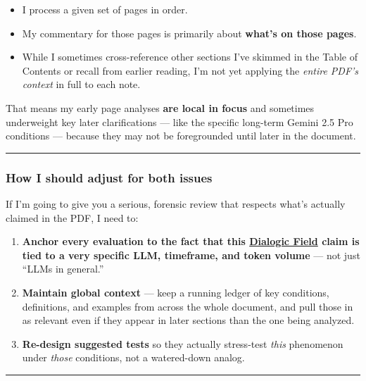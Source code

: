 \documentclass{article}
\begin{document}
\begin{itemize}
\item
  I process a given set of pages in order.
\item
  My commentary for those pages is primarily about \textbf{what's on those pages}.
\item
  While I sometimes cross-reference other sections I've skimmed in the Table of Contents or recall from earlier reading, I'm not yet applying the \emph{entire PDF's context} in full to each note.
\end{itemize}

That means my early page analyses \textbf{are local in focus} and sometimes underweight key later clarifications --- like the specific long-term Gemini 2.5 Pro conditions --- because they may not be foregrounded until later in the document.

\begin{center}\rule{0.5\linewidth}{0.5pt}\end{center}

\subsubsection*{How I should adjust for both issues}

If I'm going to give you a serious, forensic review that respects what's actually claimed in the PDF, I need to:

\begin{enumerate}
\item
  \textbf{Anchor every evaluation to the fact that this \hyperlink{gloss:dialogic_field}{Dialogic Field} claim is tied to a very specific LLM, timeframe, and token volume} --- not just ``LLMs in general.''
\item
  \textbf{Maintain global context} --- keep a running ledger of key conditions, definitions, and examples from across the whole document, and pull those in as relevant even if they appear in later sections than the one being analyzed.
\item
  \textbf{Re-design suggested tests} so they actually stress-test \emph{this} phenomenon under \emph{those} conditions, not a watered-down analog.
\end{enumerate}

\begin{center}\rule{0.5\linewidth}{0.5pt}\end{center}
\end{document}
